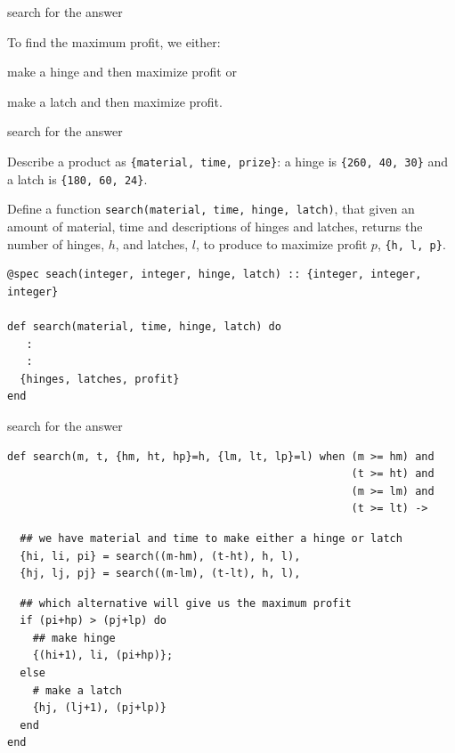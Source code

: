 \begin{frame}{search for the answer}

To find the maximum profit, we either:

\pause \vspace{20pt}\hspace{40pt}
   make a hinge and then maximize profit or

\pause \vspace{20pt}\hspace{40pt}
   make a latch and then maximize profit.

\pause \vspace{20pt}\hspace{40pt}


\end{frame}


\begin{frame}[fragile]{search for the answer}

Describe a product as {\tt \{material, time, prize\}}: a hinge is {\tt \{260, 40, 30\}} and a latch is {\tt \{180, 60, 24\}}.

\pause\vspace{20pt}

Define a function {\tt search(material, time, hinge, latch)}, that
given an amount of material, time and descriptions of hinges and
latches, returns the number of hinges, $h$, and latches, $l$, to produce to
maximize profit $p$, {\tt \{h, l, p\}}.

\pause\vspace{20pt}

\begin{verbatim}
@spec seach(integer, integer, hinge, latch) :: {integer, integer, integer}

def search(material, time, hinge, latch) do 
   :
   :
  {hinges, latches, profit}
end
\end{verbatim}
\end{frame}


\begin{frame}[fragile]{search for the answer}

\begin{verbatim}
def search(m, t, {hm, ht, hp}=h, {lm, lt, lp}=l) when (m >= hm) and 
                                                      (t >= ht) and 
                                                      (m >= lm) and 
                                                      (t >= lt) ->
\end{verbatim}\pause
\begin{verbatim}
  ## we have material and time to make either a hinge or latch
  {hi, li, pi} = search((m-hm), (t-ht), h, l),
  {hj, lj, pj} = search((m-lm), (t-lt), h, l), 
\end{verbatim}\pause
\begin{verbatim}
  ## which alternative will give us the maximum profit
  if (pi+hp) > (pj+lp) do
    ## make hinge
    {(hi+1), li, (pi+hp)};
  else
    # make a latch
    {hj, (lj+1), (pj+lp)}
  end
end
\end{verbatim}
\end{frame}

